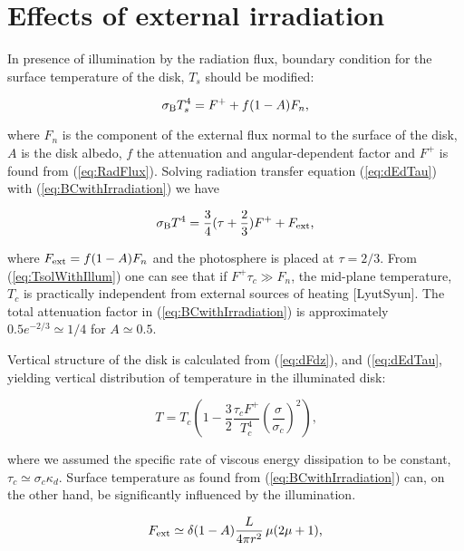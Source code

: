 \documentclass[12pt,english,preprint]{aastex}
\begin{document}
\section{Effects of external irradiation}

In presence of illumination by the radiation flux, boundary condition
for the surface temperature of the disk, $T_{s}$ should be modified:

\begin{equation}
\sigma_{{\rm B}}T_{s}^{4}=F^{+}+f(1-A)F_{n}\mbox{,}\label{eq:BCwithIrradiation}
\end{equation}

\noindent where $F_{n}$ is the component of the external flux normal to the
surface of the disk, $A$ is the disk albedo, $f$ the attenuation and angular-dependent
factor and $F^{+}$ is found from (\ref{eq:RadFlux}). Solving radiation
transfer equation (\ref{eq:dEdTau}) with (\ref{eq:BCwithIrradiation})
we have

\begin{equation}
\sigma_{{\rm B}}T^{4}=\frac{3}{4}(\tau+\frac{2}{3})F^{+}+F_{{\rm ext}}\mbox{,}\label{eq:TsolWithIllum}
\end{equation}

\noindent where $F_{{\rm ext}}=f(1-A)F_{n}$ and the photosphere is placed at
$\tau=2/3$. From (\ref{eq:TsolWithIllum}) one can see that if $F^{+}\tau_{c}\gg F_{n}$,
the mid-plane temperature, $T_{c}$ is practically independent from
external sources of heating {[}LyutSyun{]}. The total attenuation
factor in (\ref{eq:BCwithIrradiation}) is approximately $0.5e^{-2/3}\simeq1/4$
for $A\simeq0.5$.

Vertical structure of the disk is calculated from (\ref{eq:dFdz}), and
(\eqref{eq:dEdTau}, yielding vertical distribution of temperature
in the illuminated disk:

\begin{equation}
T=T_{c}\left(1-\frac{3}{2}\frac{\tau_{c}F^{+}}{T_{c}^{4}}\left(\frac{\sigma}{\sigma_{c}}\right)^{2}\right)\mbox{,}\label{eq:TcWithIllum}
\end{equation}

\noindent where we assumed the specific rate of viscous energy dissipation to
be constant, $\tau_{c}\simeq\sigma_{c}\kappa_{d}$. Surface temperature
as found from (\ref{eq:BCwithIrradiation}) can, on the other hand,
be significantly influenced by the illumination.

\begin{equation}
F_{{\rm ext}}\simeq\delta(1-A)\frac{L}{4\pi r^{2}}\,\mu(2\mu+1)\mbox{,}\label{eq:FextFormula}
\end{equation}
\end{document}
